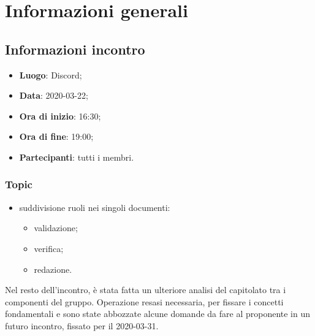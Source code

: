 \section{Informazioni generali}
\subsection{Informazioni incontro}
\begin{itemize}
\item \textbf{Luogo}: Discord\glo;
\item \textbf{Data}: 2020-03-22;
\item \textbf{Ora di inizio}: 16:30;
\item \textbf{Ora di fine}: 19:00;
\item \textbf{Partecipanti}: tutti i membri.
\end{itemize}

\subsubsection{Topic}
\begin{itemize}
\item suddivisione ruoli nei singoli documenti: 
\begin{itemize}
\item validazione;
\item verifica;
\item redazione.
\end{itemize}
\end{itemize}
Nel resto dell'incontro, è stata fatta un ulteriore analisi del capitolato tra i componenti del gruppo. Operazione resasi necessaria, per fissare i concetti fondamentali e sono state abbozzate alcune domande da fare al proponente in un futuro incontro, fissato per il 2020-03-31.